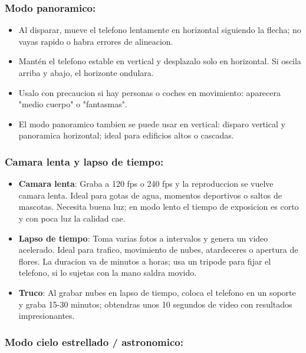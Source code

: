 \subsubsection*{Modo panoramico:}

\begin{itemize}
  \item Al disparar, mueve el telefono lentamente en horizontal siguiendo la flecha; no vayas rapido o habra errores de alineacion.
  \item Mantén el telefono estable en vertical y desplazalo solo en horizontal. Si oscila arriba y abajo, el horizonte ondulara.
  \item Usalo con precaucion si hay personas o coches en movimiento: aparecera "medio cuerpo" o "fantasmas".
  \item El modo panoramico tambien se puede usar en vertical: disparo vertical y panoramica horizontal; ideal para edificios altos o cascadas.
\end{itemize}

\subsubsection*{Camara lenta y lapso de tiempo:}

\begin{itemize}
  \item \textbf{Camara lenta}: Graba a 120 fps o 240 fps y la reproduccion se vuelve camara lenta. Ideal para gotas de agua, momentos deportivos o saltos de mascotas. Necesita buena luz; en modo lento el tiempo de exposicion es corto y con poca luz la calidad cae.
  \item \textbf{Lapso de tiempo}: Toma varias fotos a intervalos y genera un video acelerado. Ideal para trafico, movimiento de nubes, atardeceres o apertura de flores. La duracion va de minutos a horas; usa un tripode para fijar el telefono, si lo sujetas con la mano saldra movido.
  \item \textbf{Truco}: Al grabar nubes en lapso de tiempo, coloca el telefono en un soporte y graba 15-30 minutos; obtendras unos 10 segundos de video con resultados impresionantes.
\end{itemize}

\subsubsection*{Modo cielo estrellado / astronomico:}

